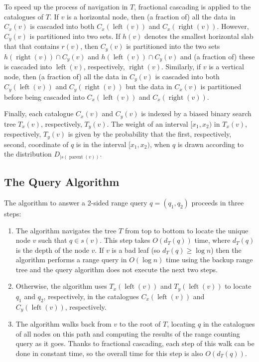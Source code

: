\documentclass[lotsofwhite,charterfonts]{patmorin}
\DeclareMathOperator{\lft}{left}
\DeclareMathOperator{\rght}{right}
\DeclareMathOperator{\prnt}{parent}
\begin{document}
To speed up the process of navigation in $T$, fractional cascading
\cite{ae76} is applied to the catalogues of $T$.  If $v$ is a
horizontal node, then (a fraction of) all the data in $C_x(v)$ is
cascaded into both $C_x(\lft(v))$ and $C_x(\rght(v))$.  However,
$C_y(v)$ is partitioned into two sets.  If $h(v)$ denotes the smallest
horizontal slab that that contains $r(v)$, then $C_y(v)$ is
partitioned into the two sets $h(\rght(v))\cap C_y(v)$ and
$h(\lft(v))\cap C_y(v)$ and (a fraction of) these is cascaded into
$\lft(v)$, respectively, $\rght(v)$.  Similarly, if $v$ is a vertical
node, then (a fraction of) all the data in $C_y(v)$ is cascaded into
both $C_y(\lft(v))$ and $C_y(\rght(v))$ but the data in $C_x(v)$ is
partitioned before being cascaded into $C_x(\lft(v))$ and
$C_x(\rght(v))$.

Finally, each catalogue $C_x(v)$ and $C_y(v)$ is indexed by a biased
binary search tree $T_x(v)$, respectively, $T_y(v)$.  The weight of an
interval $[x_1,x_2)$ in $T_x(v)$, respectively, $T_y(v)$ is given by
the probability that the first, respectively, second, coordinate of
$q$ is in the interval $[x_1,x_2)$, when $q$ is drawn according to the
distribution $D_{\mid s(\prnt(v))}$.


\subsection{The Query Algorithm}

The algorithm to answer a 2-sided range query $q=(q_1,q_2)$ proceeds
in three steps:

\begin{enumerate}

\item The algorithm navigates the tree $T$ from top to bottom to
locate the unique node $v$ such that $q\in s(v)$. This step takes
$O(d_T(q))$ time, where $d_T(q)$ is the depth of the node $v$.  If $v$
is a bad leaf (so $d_T(q)\ge \log n$) then the algorithm performs a
range query in $O(\log n)$ time using the backup range tree and the
query algorithm does not execute the next two steps.

\item  Otherwise, the algorithm uses $T_x(\lft(v))$ and
$T_y(\lft(v))$ to locate $q_1$ and $q_2$, respectively, in the catalogues
$C_x(\lft(v))$ and $C_y(\lft(v))$, respectively.

\item The algorithm walks back from $v$ to the root of $T$, locating
$q$ in the catalogues of all nodes on this path and computing the
results of the range counting query as it goes.  Thanks to fractional
cascading, each step of this walk can be done in constant time, so the
overall time for this step is also $O(d_T(q))$.
\end{enumerate}
\end{document}
